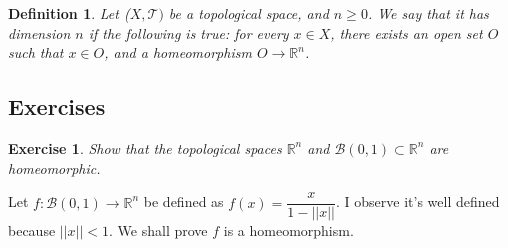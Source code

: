 \documentclass[a4paper,11pt]{article}
\theoremstyle{mytheor}
\newtheorem{definition}{Definition}[subsection]
\theoremstyle{mytheor}
\newtheorem{exercise}{Exercise}
\theoremstyle{remark}
\newcommand{\T}{\mathcal{T}}
\newcommand{\B}{\mathcal{B}}
\newcommand{\R}{\mathbb{R}}
\begin{document}
\begin{definition}
    Let ($X, \T)$ be a topological space, and $n \geq 0$. We say that it has
    dimension $n$ if the following is true: for every $x \in X$, there exists
    an open set $O$ such that $x \in O$, and a homeomorphism $O \to \R^n$.
\end{definition}

\subsection{Exercises}

\begin{exercise}
    Show that the topological spaces $\R^n$ and $\B(0, 1) \subset \R^n$ are homeomorphic.
\end{exercise}

Let $f: \B(0,1) \to \R^n$ be defined as $f(x) = \dfrac{x}{1 - ||x||}$. I
observe it's well defined because $||x|| < 1$. We shall prove $f$ is a
homeomorphism. 
\end{document}
